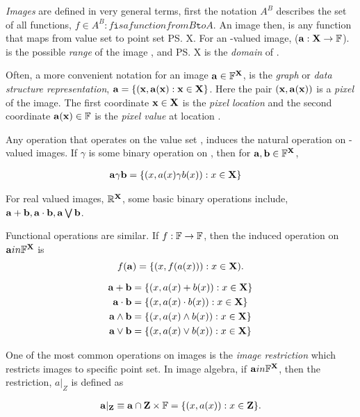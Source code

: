 \documentclass{vldb}
\begin{document}
\emph{Images} are defined in very general terms, first the notation
$A^B$ describes the set of all functions, $f \in A^B: f {\texttt is a
  function from} B {\texttt to} A$.  An image then, is any function
that maps from value set  to point set \ps{X}.  For an
-valued image,  (${\bf{a}}: {\bf{X}} \to {\ensuremath{\mathbb{F}}}$).   is
the possible \emph{range} of the image , and \ps{X} is the
\emph{domain} of .

Often, a more convenient notation for an image ${\bf{a}} \in
{\ensuremath{\mathbb{F}}}^{{\bf{X}}}$, is the \emph{graph} or \emph{data structure
  representation}, ${\bf{a}} = \{({\bf{x}},{\bf{a}}({\bf{x}}) : {\bf{x}} \in
{\ensuremath{\bf{X}}}\}$.  Here the pair $({\bf{x}},{\bf{a}}({\bf{x}}))$ is a \emph{pixel}
of the image.  The first coordinate ${\bf{x}} \in {\ensuremath{\bf{X}}}$ is the
\emph{pixel location} and the second coordinate ${\bf{a}}({\bf{x}}) \in
{\ensuremath{\mathbb{F}}}$ is the \emph{pixel value} at location .

Any operation that operates on the value set , induces the
natural operation on -valued images.  If $\gamma$ is some binary
operation on , then for ${\bf{a}},{\bf{b}} \in {\ensuremath{\mathbb{F}}}^{{\bf{X}}}$,

\begin{align}
{\ensuremath{\bf{a}}} \gamma {\ensuremath{\bf{b}}} &= \{(x,a(x)\gamma b(x)) : x \in {\ensuremath{\bf{X}}}\}
\end{align}

For real valued images, ${\mathbb{R}}^{{\bf{X}}}$, some basic binary operations
include, ${\bf{a}}+{\bf{b}},{\bf{a}} \cdot {\ensuremath{\bf{b}}},{\bf{a}} \bigvee {\ensuremath{\bf{b}}}$.

Functional operations are similar.  If $f: {\mathbb{F}} \to {\ensuremath{\mathbb{F}}}$, then
the induced operation on ${\bf{a}} in {\mathbb{F}}^{{\bf{X}}}$ is \[ f({\bf{a}}) =
\{(x,f(a(x))) : x \in {\ensuremath{\bf{X}}}).\]

\begin{align}
{\ensuremath{\bf{a}}} + {\bf{b}} &= \{(x,a(x)+b(x)) : x \in {\ensuremath{\bf{X}}} \} \\
{\bf{a}} \cdot {\ensuremath{\bf{b}}} &= \{(x,a(x) \cdot b(x)) : x \in {\ensuremath{\bf{X}}} \} \\
{\bf{a}} \wedge {\ensuremath{\bf{b}}} &= \{(x,a(x) \wedge b(x)) : x \in {\ensuremath{\bf{X}}} \} \\
{\bf{a}} \vee {\ensuremath{\bf{b}}} &= \{(x,a(x) \vee b(x)) : x \in {\ensuremath{\bf{X}}} \}
\end{align}

One of the most common operations on images is the \emph{image
  restriction} which restricts images to specific point set.  In image
algebra, if ${\bf{a}} in {\mathbb{F}}^{{\bf{X}}}$, then the restriction, $a|_Z$ is
defined as

\begin{gather}
  {\ensuremath{\bf{a}}}|_{\bf{Z}} \equiv {\ensuremath{\bf{a}}} \cap {\ensuremath{\bf{Z}}} \times {\ensuremath{\mathbb{F}}} = \{(x,a(x)): x \in {\ensuremath{\bf{Z}}}\}.
\end{gather}
\end{document}
